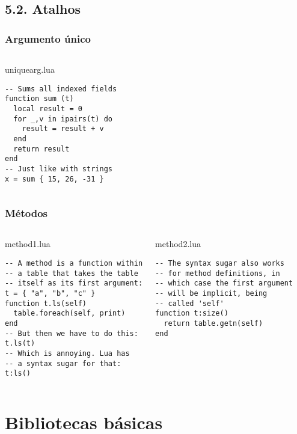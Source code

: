 \documentclass[brazil]{beamer}
\begin{document}
\subsection{5.2. Atalhos}
\begin{frame}[fragile]
  \frametitle{Argumento único}
  \pause
  \begin{columns}
      \begin{block}{uniquearg.lua}
        \begin{lstlisting}
-- Sums all indexed fields
function sum (t)
  local result = 0
  for _,v in ipairs(t) do
    result = result + v
  end
  return result
end
-- Just like with strings
x = sum { 15, 26, -31 }
        \end{lstlisting}
      \end{block}
  \end{columns}
\end{frame}
\begin{frame}[fragile]
  \frametitle{Métodos}
  \pause
  \begin{columns}
      \begin{block}{method1.lua}
        \begin{lstlisting}
-- A method is a function within
-- a table that takes the table
-- itself as its first argument:
t = { "a", "b", "c" }
function t.ls(self)
  table.foreach(self, print)
end
-- But then we have to do this:
t.ls(t)
-- Which is annoying. Lua has
-- a syntax sugar for that:
t:ls()
        \end{lstlisting}
      \end{block}
    \pause
      \begin{block}{method2.lua}
        \begin{lstlisting}
-- The syntax sugar also works
-- for method definitions, in
-- which case the first argument
-- will be implicit, being
-- called 'self'
function t:size()
  return table.getn(self)
end
        \end{lstlisting}
      \end{block}
  \end{columns}
\end{frame}
\section{Bibliotecas básicas}
\end{document}
